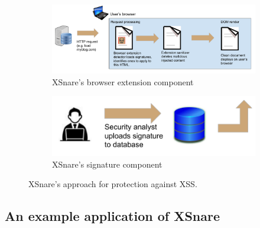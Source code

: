  \begin{figure}[h]
 	\begin{subfigure}[b]{1.0\textwidth}
 		\centering
 		\includegraphics[scale=0.55]{img/xsnare_top.pdf}
 		\caption{XSnare's browser extension component}
 		\label{fig:extension}
 	\end{subfigure}
	 \hfill
	 \begin{subfigure}[b]{0.75\textwidth}
 		\includegraphics[scale=0.55]{img/xsnare_bot.pdf}
 		\caption{XSnare's signature component}
 		\label{fig:signatures}
 	\end{subfigure}
 	 	\caption{XSnare's approach for protection against XSS.}
		\label{fig:xsnare}
 \end{figure}

\subsection{An example application of XSnare}

